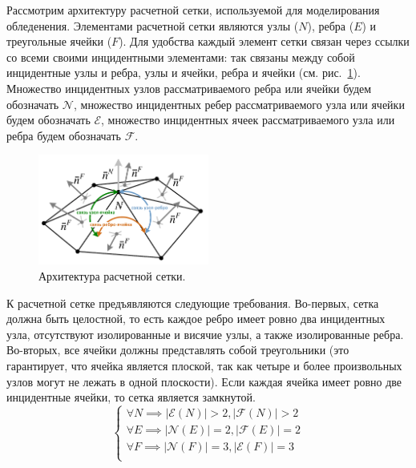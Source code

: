 Рассмотрим архитектуру расчетной сетки, используемой для моделирования обледенения.
Элементами расчетной сетки являются узлы ($N$), ребра ($E$) и треугольные ячейки ($F$).
Для удобства каждый элемент сетки связан через ссылки со всеми своими инцидентными элементами: так связаны между собой инцидентные узлы и ребра, узлы и ячейки, ребра и ячейки (см. рис.~\ref{fig:text_1_remesh3_architecture}).
Множество инцидентных узлов рассматриваемого ребра или ячейки будем обозначать $\mathscr{N}$, множество инцидентных ребер рассматриваемого узла или ячейки будем обозначать $\mathscr{E}$, множество инцидентных ячеек рассматриваемого узла или ребра будем обозначать $\mathscr{F}$.

\begin{figure}[ht]
\centering
\includegraphics[width=0.5\textwidth]{fig/3dr_architecture.pdf}
\singlespacing
{}\caption{Архитектура расчетной сетки.}
\label{fig:text_1_remesh3_architecture}
\end{figure}

К расчетной сетке предъявляются следующие требования.
Во-первых, сетка должна быть целостной, то есть каждое ребро имеет ровно два инцидентных узла, отсутствуют изолированные и висячие узлы, а также изолированные ребра.
Во-вторых, все ячейки должны представлять собой треугольники (это гарантирует, что ячейка является плоской, так как четыре и более произвольных узлов могут не лежать в одной плоскости).
Если каждая ячейка имеет ровно две инцидентные ячейки, то сетка является замкнутой.
\begin{equation}\label{eqn:text_1_remesh3_arch}
\begin{cases}
\forall N \implies |\mathscr{E}(N)| > 2, |\mathscr{F}(N)| > 2 \\
\forall E \implies |\mathscr{N}(E)| = 2, |\mathscr{F}(E)| = 2 \\
\forall F \implies |\mathscr{N}(F)| = 3, |\mathscr{E}(F)| = 3 \\
\end{cases}
\end{equation}

